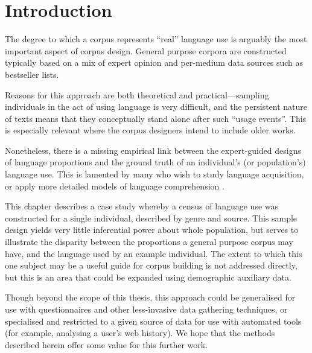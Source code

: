 \section{Introduction}
The degree to which a corpus represents ``real'' language use is arguably the most important aspect of corpus design.  General purpose corpora are constructed typically based on a mix of expert opinion and per-medium data sources such as bestseller lists.


Reasons for this approach are both theoretical and practical---sampling individuals in the act of using language is very difficult, and the persistent nature of texts means that they conceptually stand alone after such ``usage events''.  This is especially relevant where the corpus designers intend to include older works.

Nonetheless, there is a missing empirical link between the expert-guided designs of language proportions and the ground truth of an individual's (or population's) language use.  This is lamented by many who wish to study language acquisition, or apply more detailed models of language comprehension .




This chapter describes a case study whereby a census of language use was constructed for a single individual, described by genre and source.  This sample design yields very little inferential power about whole population, but serves to illustrate the disparity between the proportions a general purpose corpus may have, and the language used by an example individual.  The extent to which this one subject may be a useful guide for corpus building is not addressed directly, but this is an area that could be expanded using demographic auxiliary data.

Though beyond the scope of this thesis, this approach could be generalised for use with questionnaires and other less-invasive data gathering techniques, or specialised and restricted to a given source of data for use with automated tools (for example, analysing a user's web history).  We hope that the methods described herein offer some value for this further work.













